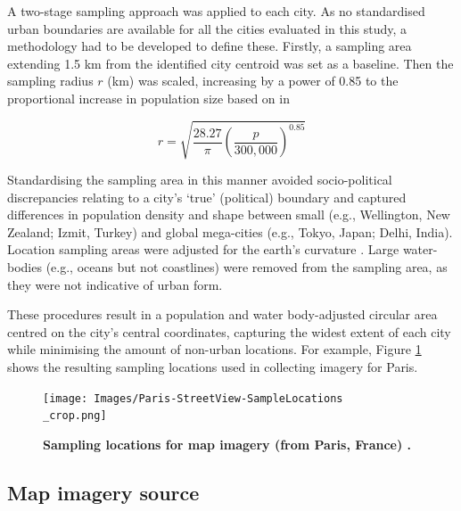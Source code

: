\documentclass{nature}
\begin{document}
A two-stage sampling approach was applied to each city. As no standardised urban boundaries are available for all the cities evaluated in this study, a methodology had to be developed to define these. Firstly, a sampling area extending 1.5 km from the identified city centroid \cite{UN2014} was set as a baseline. Then the sampling radius $r$ (km) was scaled, increasing by a power of 0.85 to the proportional increase in population size based on \cite{Barthelemy2016} in 

\begin{equation}
r = \sqrt{ \frac{28.27}{\pi} \left( \frac{p}{300,000}  \right) ^{0.85} }
\end{equation}


Standardising the sampling area in this manner avoided socio-political discrepancies relating to a city's `true' (political) boundary and captured differences in population density and shape between small (e.g., Wellington, New Zealand; Izmit, Turkey) and global mega-cities (e.g., Tokyo, Japan;  Delhi, India). Location sampling areas were adjusted for the earth's curvature \cite{Sinnott1984}. Large water-bodies (e.g., oceans but not coastlines) were removed from the sampling area, as they were not indicative of urban form. 

These procedures result in a population and water body-adjusted circular area centred on the city's central coordinates, capturing the widest extent of each city while minimising the amount of non-urban locations. For example, Figure \ref{fig:parissample} shows the resulting sampling locations used in collecting imagery for Paris. 

\begin{figure}
    \centering    
\texttt{[image: Images/Paris-StreetView-SampleLocations\\\_crop.png]}  
\caption{\bf Sampling locations for map imagery (from Paris, France) \cite{GoogleStatic2017}.}    
 \label{fig:parissample}  
\end{figure} 



\subsection{Map imagery source}\label{methodsimagery}
\end{document}
